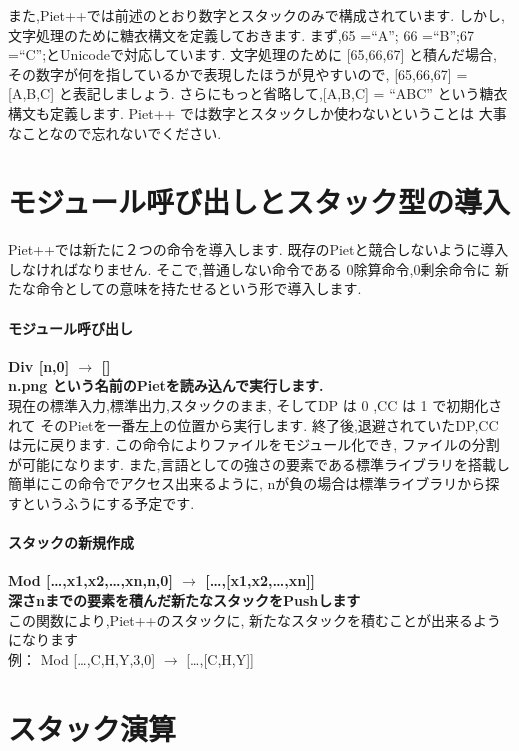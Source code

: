 また,Piet++では前述のとおり数字とスタックのみで構成されています.
しかし,文字処理のために糖衣構文を定義しておきます. まず,65 =``A''; 66
=``B'';67 =``C'';とUnicodeで対応しています. 文字処理のために
{[}65,66,67{]} と積んだ場合,
その数字が何を指しているかで表現したほうが見やすいので, {[}65,66,67{]} =
{[}A,B,C{]} と表記しましょう. さらにもっと省略して,{[}A,B,C{]} = ``ABC''
という糖衣構文も定義します. Piet++
では数字とスタックしか使わないということは
大事なことなので忘れないでください.　　

\section{モジュール呼び出しとスタック型の導入}

Piet++では新たに２つの命令を導入します.
既存のPietと競合しないように導入しなければなりません.
そこで,普通しない命令である 0除算命令,0剰余命令に
新たな命令としての意味を持たせるという形で導入します.

\paragraph{モジュール呼び出し}

\textbf{Div {[}n,0{]} $\to$ {[}{]}}\\\textbf{n.png
という名前のPietを読み込んで実行します.}\\現在の標準入力,標準出力,スタックのまま,
そしてDP は 0 ,CC は 1 で初期化されて
そのPietを一番左上の位置から実行します.
終了後,退避されていたDP,CCは元に戻ります.
この命令によりファイルをモジュール化でき,
ファイルの分割が可能になります.
また,言語としての強さの要素である標準ライブラリを搭載し
簡単にこの命令でアクセス出来るように,
nが負の場合は標準ライブラリから探すというふうにする予定です.

\paragraph{スタックの新規作成}

\textbf{Mod {[}\ldots{},x1,x2,\ldots{},xn,n,0{]} $\to$
{[}\ldots{},{[}x1,x2,\ldots{},xn{]}{]}}\\\textbf{深さnまでの要素を積んだ新たなスタックをPushします}\\この関数により,Piet++のスタックに,
新たなスタックを積むことが出来るようになります\\例： Mod
{[}\ldots{},C,H,Y,3,0{]} $\to$ {[}\ldots{},{[}C,H,Y{]}{]}

\section{スタック演算}

